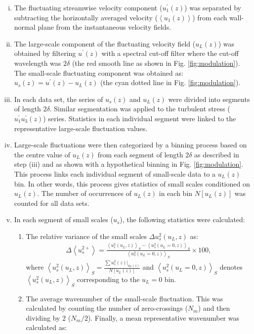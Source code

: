\begin{enumerate}[(i)]
\item The fluctuating streamwise velocity component ($u_{1}^\prime(z)$) was separated by subtracting the horizontally averaged velocity ($\left< u_{1}(z)\right>$) from each wall-normal plane from the instantaneous velocity fields.
\item The large-scale component of the fluctuating velocity field ($u_L(z)$) was obtained by filtering $u^\prime(z)$ with a spectral cut-off filter where the cut-off wavelength was $2\delta$ (the red smooth line as shown in Fig. \ref{fig:modulation}). The small-scale fluctuating component was obtained as: $u_s(z)=u^\prime(z)-u_L(z)$ (the cyan dotted line in Fig. \ref{fig:modulation}).
\item In each data set, the series of $u_s(z)$ and $u_L(z)$ were divided into segments of length $2\delta$. Similar segmentation was applied to the turbulent stress ($u_{1}^\prime u_{3}^\prime(z)$) series. Statistics in each individual segment were linked to the representative large-scale fluctuation values. 
\item Large-scale fluctuations were then categorized by a binning process based on the centre value of $u_L(z)$ from each segment of length $2\delta$ as described in step (iii) and as shown with a hypothetical binning in Fig. \ref{fig:modulation}. This process links each individual segment of small-scale data to a $u_L(z)$ bin. In other words, this process gives statistics of small scales conditioned on $u_L(z)$. The number of occurrences of $u_L(z)$ in each bin $N[u_L(z)]$ was counted for all data sets.    
\item In each segment of small scales ($u_s$), the following statistics were calculated:
 \begin{enumerate}[(1)]
    \item The relative variance of the small scales $\Delta u_s^2(u_L,z)$ as: 
    \begin{align}
        \Delta \left < u_s^{2+}\right > =\frac{\left < u_s^2(u_L,z)\right >_S-\left < u_s^2(u_L=0,z)\right >_S}{\left < u_s^2(u_L=0,z)\right >_S} \times 100,
    \label{eq:relative_var_us2}    
    \end{align}
    where $\left < u_s^2(u_L,z) \right >_S = \frac{\sum u_s^2(z)|_{u_L(z)}}{N[u_L(z)]}$ and $\left < u_s^2(u_L=0,z)\right >_S$ denotes $\left < u_s^2(u_L,z) \right >_S$ corresponding to the $u_L=0$ bin.
    \item The average wavenumber of the small-scale fluctuation. This was calculated by counting the number of zero-crossings ($N_m$) and then dividing by 2 ($N_m/2$). Finally, a mean representative wavenumber was calculated as:

\end{enumerate}
\end{enumerate}
